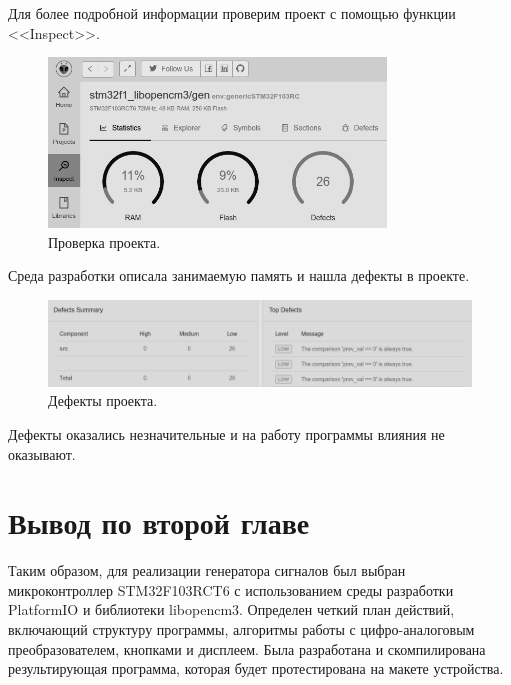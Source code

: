 	Для более подробной информации проверим проект с помощью функции <<Inspect>>.
	
	\begin{figure}[H]
    \centering
    \includegraphics[width=0.8\textwidth]{../image/inspect.png}
    \caption{Проверка проекта.}
	\end{figure}
	
	Среда разработки описала занимаемую память и нашла дефекты в проекте.
	
	\begin{figure}[H]
    \centering
    \includegraphics[width=1\textwidth]{../image/defects.png}
    \caption{Дефекты проекта.}
	\end{figure}
	
	Дефекты оказались незначительные и на работу программы влияния не оказывают.
	
\section{Вывод по второй главе}
	
	Таким образом, для реализации генератора сигналов был выбран микроконтроллер STM32F103RCT6 с использованием среды разработки PlatformIO и библиотеки libopencm3. Определен четкий план действий, включающий структуру программы, алгоритмы работы с цифро-аналоговым преобразователем, кнопками и дисплеем. Была разработана и скомпилирована результирующая программа, которая будет протестирована на макете устройства.

	
	
